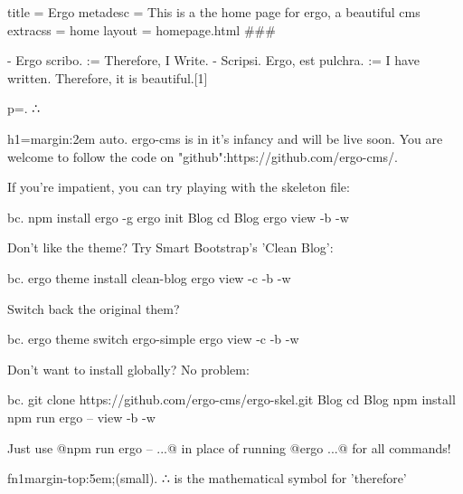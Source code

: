title = Ergo
metadesc = This is a the home page for ergo, a beautiful cms
extracss = home
layout = homepage.html
###


- Ergo scribo. := Therefore, I Write.
- Scripsi. Ergo, est pulchra. :=  I have written. Therefore, it is beautiful.[1]


p=. ∴ 


h1={margin:2em auto}. ergo-cms is in it's infancy and will be live soon. You are welcome to follow the code on "github":https://github.com/ergo-cms/.

If you're impatient, you can try playing with the skeleton file:

bc. npm install ergo -g
ergo init Blog
cd Blog
ergo view -b -w

Don't like the theme? Try Smart Bootstrap's 'Clean Blog':

bc. ergo theme install clean-blog
ergo view -c -b -w

Switch back the original them? 

bc. ergo theme switch ergo-simple
ergo view -c -b -w

Don't want to install globally? No problem:

bc. git clone https://github.com/ergo-cms/ergo-skel.git Blog
cd Blog
npm install
npm run ergo -- view -b -w

Just use @npm run ergo --  ...@ in place of running @ergo ...@ for all commands!

fn1{margin-top:5em;}(small). ∴ is the mathematical symbol for 'therefore'
